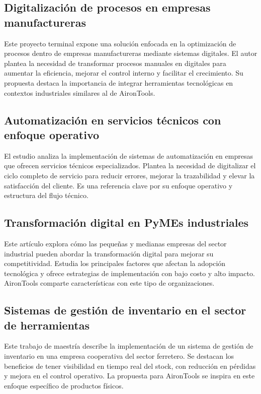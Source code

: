 \subsection{Digitalización de procesos en empresas manufactureras \cite{Garcia07}}

Este proyecto terminal expone una solución enfocada en la optimización de procesos dentro de empresas manufactureras mediante sistemas digitales. El autor plantea la necesidad de transformar procesos manuales en digitales para aumentar la eficiencia, mejorar el control interno y facilitar el crecimiento. Su propuesta destaca la importancia de integrar herramientas tecnológicas en contextos industriales similares al de AironTools.

\subsection{Automatización en servicios técnicos con enfoque operativo \cite{Nin1992}}

El estudio analiza la implementación de sistemas de automatización en empresas que ofrecen servicios técnicos especializados. Plantea la necesidad de digitalizar el ciclo completo de servicio para reducir errores, mejorar la trazabilidad y elevar la satisfacción del cliente. Es una referencia clave por su enfoque operativo y estructura del flujo técnico.

\subsection{Transformación digital en PyMEs industriales \cite{Rodeiro2012}}

Este artículo explora cómo las pequeñas y medianas empresas del sector industrial pueden abordar la transformación digital para mejorar su competitividad. Estudia los principales factores que afectan la adopción tecnológica y ofrece estrategias de implementación con bajo costo y alto impacto. AironTools comparte características con este tipo de organizaciones.

\subsection{Sistemas de gestión de inventario en el sector de herramientas \cite{Flores2015}}

Este trabajo de maestría describe la implementación de un sistema de gestión de inventario en una empresa cooperativa del sector ferretero. Se destacan los beneficios de tener visibilidad en tiempo real del stock, con reducción en pérdidas y mejora en el control operativo. La propuesta para AironTools se inspira en este enfoque específico de productos físicos.

